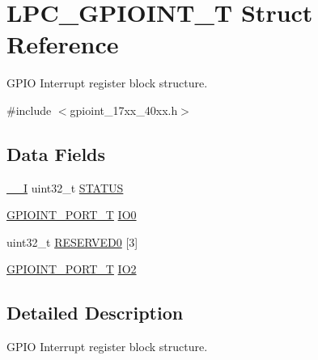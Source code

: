 \hypertarget{structLPC__GPIOINT__T}{\section{L\-P\-C\-\_\-\-G\-P\-I\-O\-I\-N\-T\-\_\-\-T Struct Reference}
\label{structLPC__GPIOINT__T}
}


G\-P\-I\-O Interrupt register block structure.  




{\ttfamily \#include $<$gpioint\-\_\-17xx\-\_\-40xx.\-h$>$}

\subsection*{Data Fields}
\begin{DoxyCompactItemize}
\item 
\hyperlink{core__cm3_8h_af63697ed9952cc71e1225efe205f6cd3}{\-\_\-\-\_\-\-I} uint32\-\_\-t \hyperlink{structLPC__GPIOINT__T_a9547c1d447b762a819920fe2a10c5029}{S\-T\-A\-T\-U\-S}
\item 
\hyperlink{structGPIOINT__PORT__T}{G\-P\-I\-O\-I\-N\-T\-\_\-\-P\-O\-R\-T\-\_\-\-T} \hyperlink{structLPC__GPIOINT__T_a4edac525fb01aae7b57c4bcc9563ae27}{I\-O0}
\item 
uint32\-\_\-t \hyperlink{structLPC__GPIOINT__T_a6afff78f3399fec13a72b78999cc6b80}{R\-E\-S\-E\-R\-V\-E\-D0} \mbox{[}3\mbox{]}
\item 
\hyperlink{structGPIOINT__PORT__T}{G\-P\-I\-O\-I\-N\-T\-\_\-\-P\-O\-R\-T\-\_\-\-T} \hyperlink{structLPC__GPIOINT__T_a1300843bc75ee56c6177f05f69b23ef8}{I\-O2}
\end{DoxyCompactItemize}


\subsection{Detailed Description}
G\-P\-I\-O Interrupt register block structure. 

